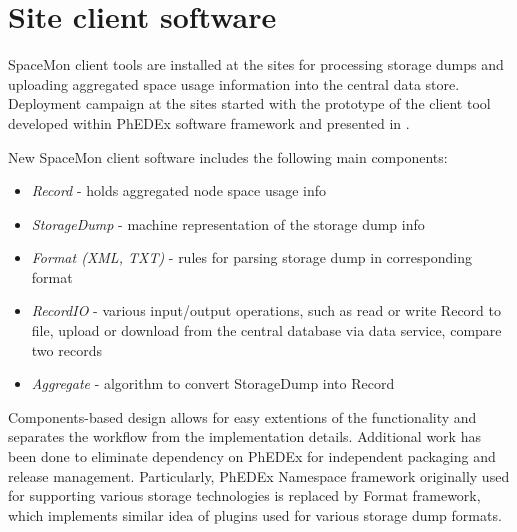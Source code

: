 \section {Site client software}

SpaceMon client tools are installed at the sites for processing storage dumps and uploading aggregated
space usage information into the central data store.  Deployment campaign at the sites started with 
the prototype of the client tool developed within PhEDEx software framework \cite{phedexframework} and 
presented in \cite{spacemon}. 

New SpaceMon client software includes the following main components: 
 \begin{itemize}
\item {\it Record} -  holds aggregated node space usage info 
\item {\it StorageDump} - machine representation of the storage dump info
\item {\it Format (XML, TXT) } - rules for parsing storage dump in corresponding format
\item {\it RecordIO } - various input/output operations, such as read or write Record to file, upload or download from the central database via data service, compare two records
\item {\it Aggregate } - algorithm to convert StorageDump into Record   
 \end{itemize}

Components-based design allows for easy extentions of the functionality and separates the workflow
from the implementation details. 
Additional work has been done to eliminate dependency on PhEDEx for independent packaging and release management. 
Particularly, PhEDEx Namespace framework originally used for supporting various storage technologies is replaced
by Format framework, which implements similar idea of plugins used for various storage dump formats.
